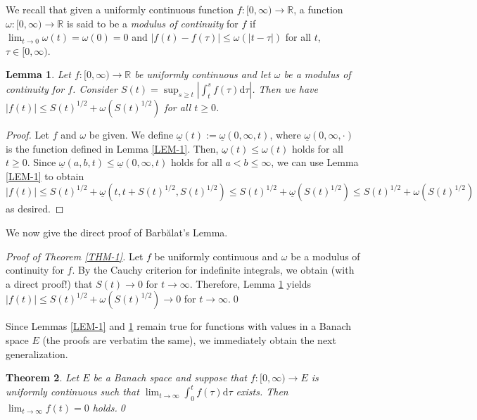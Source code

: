 \documentclass[10pt, a4paper, reqno]{amsart}
\theoremstyle{normal}
\newtheorem{thm}{Theorem}
\newtheorem{lem}[thm]{Lemma}
\newcommand{\dd}{\mathrm{d}}
\newcommand{\omegapr}{\underline{\omega}}
\begin{document}
\smallskip

We recall that given a uniformly continuous function $f\colon[0,\infty)\rightarrow\mathbb{R}$, a function $\omega\colon[0,\infty)\rightarrow\mathbb{R}$ is said to be a \emph{modulus of continuity} for $f$ if $\lim_{t\rightarrow 0}\omega(t)=\omega(0)=0$ and $|f(t)-f(\tau)|\leqslant\omega(|t-\tau|)$  for all $t$, $\tau\in[0,\infty)$.

\smallskip

\begin{lem}\label{LEM-2} Let $f:[0,\infty)\to\mathbb{R}$ be uniformly continuous and let $\omega$ be a modulus of continuity for $f$. Consider $S(t)=\sup_{s\geqslant{}t}|\int_t^sf(\tau)\dd\tau|$. Then we have $|f(t)|\leqslant S(t)^{1/2}+\omega(S(t)^{1/2})$ for all $t\geqslant0$.
\end{lem}
\begin{proof} Let $f$ and $\omega$ be given. We define $\underline{\omega}(t):=\omegapr(0,\infty,t)$, where $\omegapr(0,\infty,\cdot)$ is the function defined in Lemma \ref{LEM-1}. Then, $\underline{\omega}(t)\leqslant\omega(t)$ holds for all $t\geqslant0$. Since $\omegapr(a,b,t)\leqslant\omegapr(0,\infty,t)$ holds for all $a<b\leqslant\infty$, we can use Lemma \ref{LEM-1} to obtain
$$
|f(t)|\leqslant S(t)^{1/2}+{\omegapr}(t,t+S(t)^{1/2},S(t)^{1/2})\leqslant  S(t)^{1/2}+\underline{\omega}(S(t)^{1/2})\leqslant S(t)^{1/2}+\omega(S(t)^{1/2})
$$
as desired.
\end{proof}


We now give the direct proof of Barb\u{a}lat's Lemma.

\medskip

\emph{Proof of Theorem \ref{THM-1}.} Let $f$ be uniformly continuous and $\omega$ be a modulus of continuity for $f$. By the Cauchy criterion for indefinite integrals, we obtain (with a direct proof!) that $S(t)\rightarrow0$ for $t\rightarrow\infty$. Therefore, Lemma \ref{LEM-2} yields $|f(t)|\leqslant S(t)^{1/2}+\omega(S(t)^{1/2})\rightarrow 0$ for $t\rightarrow\infty$.\hfill\qed 

\medskip

Since Lemmas \ref{LEM-1} and \ref{LEM-2} remain true for functions with values in a Banach space $E$ (the proofs are verbatim the same), we immediately obtain the next generalization.

\smallskip

\begin{thm}\label{THM-12} Let $E$ be a Banach space and suppose that $f\colon[0,\infty)\rightarrow E$ is uniformly continuous such that  $\lim_{t\rightarrow\infty}\int_0^tf(\tau)\dd\tau$ exists. Then $\lim_{t\rightarrow\infty}f(t)=0$ holds.\hfill\qed
\end{thm}
\end{document}
